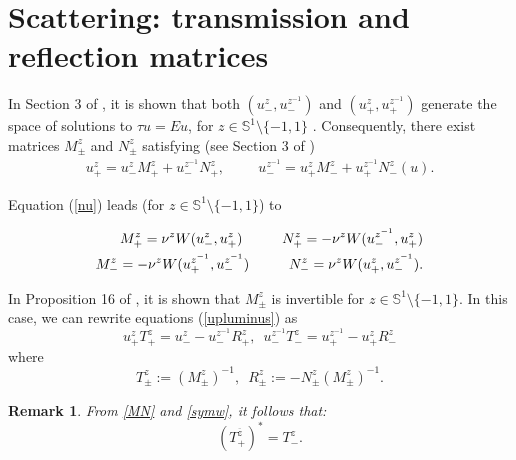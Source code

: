 \documentclass[12pt,oneside,onecolumn,open]{article}
\newtheorem{obs}[teo]{Remark}
\begin{document}
 
 
 \section{Scattering: transmission and reflection matrices}\label{SM}
In Section 3 of \cite{MR4385984}, it is shown that both $(u_{-}^{z}, u_{-}^{z^{-1}})$ and $(u_{+}^{z}, u_{+}^{z^{-1}})$ generate the space of solutions to $\tau u = Eu$, for $z \in \mathbb{S}^1 \setminus \{-1, 1 \}$ . Consequently, there exist matrices $M_{\pm}^{z}$ and $N_{\pm}^{z}$ satisfying (see Section 3 of \cite{MR4385984})
\begin{align}
\label{upluminus}
    u_{+}^{z}=u_{-}^{z}M_{+}^{z}+u_{-}^{z^{-1}}N_{+}^{z},\hspace{1cm}  u_{-}^{z^{-1}}=u_{+}^{z}M_{-}^{z}+u_{+}^{z^{-1}}N_{-}^{z}(u).
\end{align}
 
 Equation (\ref{nu}) leads (for $z \in \mathbb{S}^1 \setminus \{ -1, 1 \}$)  to  

    

        
\begin{align}\label{MN}
    M^{z}_{+}=\nu ^{z}W(u^{z}_{-}, u^{z}_{+}) \hspace{1cm}
    N^{z}_{+}=-\nu ^{z}W(u^{z^{-1}}_{-}, u^{z}_{+})   \\
    M^{z}_{-}=-\nu ^{z}W(u^{z^{-1}}_{+}, u^{z^{-1}}_{-})\hspace{1cm}
    N^{z}_{-}=\nu ^{z}W(u^{z}_{+}, u^{z^{-1}}_{-}) . \notag
\end{align}
    
 In Proposition 16 of \cite{MR4385984}, it is shown that $M_{\pm}^{z}$ is invertible for $z \in \mathbb{S}^1 \setminus \{-1, 1\}$. In this case, we can rewrite equations (\ref{upluminus}) as
\begin{equation}
\label{TReq}
      u^{z}_{+}T^{z}_{+}= u^{z}_{- }-u^{z^{-1}}_{- }R^{z}_{+},\,\,\,
      u^{z^{-1}}_{-}T^{z}_{-}=u^{z^{-1}}_{+}-u^{z}_{+}R^{z}_{-}
  \end{equation}
where
\begin{equation}
\label{eq:TR1}
    T^{z}_{\pm}:=(M^{z}_{\pm})^{-1}, \,\,\, R^{z}_{\pm}:=-N^{z}_{\pm}(M^{z}_{\pm})^{-1}.
\end{equation}

  \begin{obs}
     From \eqref{MN} and \eqref{symw}, it follows that:
      \begin{equation}
      \label{Tproperty}
          (T^{\overline{z}}_{+})^{*}=T^{z}_{-}.
      \end{equation}
  \end{obs}  
\end{document}
